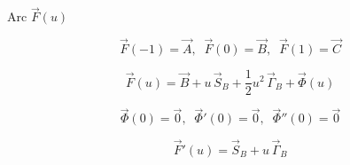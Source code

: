 \documentclass[aps,12pt]{revtex4}
\begin{document}
Arc $\vec{F}(u)$

\begin{equation}
	\vec{F}(-1) = \vec{A},\;\; \vec{F}(0) = \vec{B}, \;\; \vec{F}(1) = \vec{C}
\end{equation}

\begin{equation}
	\vec{F}(u) = \vec{B} + u\,\vec{S}_B + \frac{1}{2}u^2 \, \vec{\Gamma}_B + \vec{\Phi}(u)
\end{equation}

\begin{equation}
	\vec{\Phi}(0) = \vec{0}, \;\; \vec{\Phi}'(0) = \vec{0},\;\; \vec{\Phi}''(0) = \vec{0}
\end{equation}

\begin{equation}
	\vec{F}'(u) = \vec{S}_B + u\, \vec{\Gamma}_B 
\end{equation}
\end{document}
